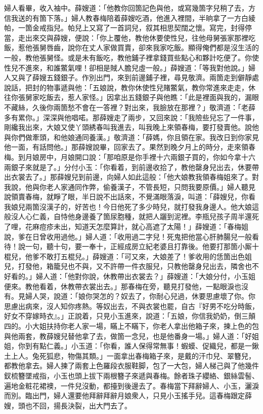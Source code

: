 婦人看畢，收入袖中。薛嫂道：「他教你回箇記色與他，或寫幾箇字兒稍了去，方信我送的有箇下落。」婦人教春梅陪着薛嫂吃酒，他進入裡間，半晌拿了一方白綾帕，一箇金戒指兒。帕兒上又寫了一首詞兒，叙其相思契闊之懷。寫完，封得停當，走出來交與薛嫂，便說：「你上覆他，教他休要使性兒，往他母舅張家那裡吃飯，惹他張舅唇齒，說你在丈人家做買賣，卻來我家吃飯。顯得俺們都是沒生活的一般，教他張舅怪。或是未有飯吃，教他鋪子裡拿錢買些點心和夥計吃便了。你使性兒不進來，和誰鱉氣哩！卻相是賊人膽兒虛一般。」薛嫂道：「等我對他說。」婦人又與了薛嫂五錢銀子。作別出門，來到前邊鋪子裡，尋見敬濟。兩箇走到僻靜處說話，把封的物事遞與他：「五娘說，教你休使性兒賭鱉氣，教你常進來走走，休往你張舅家吃飯去，惹人家怪。」因拿出五錢銀子與他瞧：「此是裡面與我的，漏眼不藏絲，久後你兩箇愁不會在一答裡？對出來，我臉放在那裡？」敬濟道：「老薛多有累你。」深深與他唱喏。那薛嫂走了兩步，又回來說：「我險些兒忘了一件事，剛纔我出來，大娘又使丫頭綉春叫我進去，叫我晚上來領春梅，要打發賣他。說他與你們做牽頭，和他娘通同養漢。」敬濟道：「薛媽，你且領在家。我改日到你家見他一面，有話問他。」那薛嫂說畢，回家去了。果然到晚夕月上的時分，走來領春梅。到月娘房中，月娘開口說：「那咱原是你手裡十六兩銀子買的，你如今拿十六兩銀子來就是了。」分付小玉：「你看着，到前邊收拾了，教他罄身兒出去，休要帶出衣裳去了。」那薛嫂兒到前邊，向婦人如此這般：「他大娘教我領春梅姐來了。對我說，他與你老人家通同作弊，偷養漢子，不管長短，只問我要原價。」婦人聽見說領賣春梅，就睜了眼，半日說不出話來，不覺滿眼落淚，叫道：「薛嫂兒，你看我娘兒兩箇沒漢子的，好苦也！{}今日他死了多少時兒，就打發我身邊人。他大娘這般沒人心仁義，自恃他身邊養了箇尿胞種，就把人躧到泥裡。李瓶兒孩子周半還死了哩，花麻痘疹未出，知道天怎麼算計，就心高遮了太陽！」薛嫂道：「春梅姐說，爹在日曾收用過他。」婦人道：「收用過二字兒！死鬼把他當心肝肺腸兒一般看待！說一句，聽十句，要一奉十，正經成房立紀老婆且打靠後。他要打那箇小厮十棍兒，他爹不敢打五棍兒。」薛嫂道：「可又來，大娘差了！爹收用的恁箇出色姐兒，打發他，箱籠兒也不與，又不許帶一件衣服兒，只教他罄身兒出去，隣舍也不好看的。」{}婦人道：「他對你說，休教帶出衣裳去？」薛嫂道：「大娘分付，小玉姐便來。教他看着，休教帶衣裳出去。」那春梅在旁，聽見打發他，一點眼淚也沒有。見婦人哭，說道：「娘你哭怎的？奴去了，你耐心兒過，休要思慮壞了你。你思慮出病來，沒人知你疼熱。等奴出去，不與衣裳也罷，自古『好男不吃分時飯，好女不穿嫁時衣』。」{}正說着，只見小玉進來，說道：「五娘，你信我奶奶，倒三顛四的。小大姐扶持你老人家一場，瞞上不瞞下，你老人拿出他箱子來，揀上色的包與他兩套，教薛嫂兒替他拿了去，做箇一念兒，也是他番身一場。」婦人道：「好姐姐，你到有點仁義。」小玉道：「你看，誰人保得常無事！蝦蟆、促織兒，都是一鍬土上人。兔死狐悲，物傷其類。」一面拿出春梅箱子來，是戴的汗巾兒、翠簪兒，都教他拿去。婦人揀了兩套上色羅段衣服鞋脚，包了一大包，婦人梯己與了他幾件釵梳簪墜戒指，小玉也頭上拔下兩根簪子來遞與春梅。餘者珠子纓絡、銀絲雲髻、遍地金粧花裙襖，一件兒沒動，都擡到後邊去了。春梅當下拜辭婦人、小玉，灑淚而別。臨出門，婦人還要他拜辭拜辭月娘衆人，{}只見小玉搖手兒。這春梅跟定薛嫂，頭也不回，揚長決裂，出大門去了。{}

